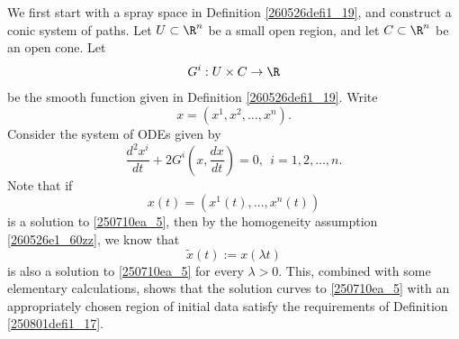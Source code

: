 \documentclass{article}
\numberwithin{equation}{section}
\theoremstyle{plain}
\begin{document}
We first start with a spray space in Definition \ref{260526defi1_19}, and construct a conic system of paths. Let $U\subset \R^n$ be a small open region, and let $C\subset \R^n$ be an open cone. Let
\begin{equation}
G^i: U\times C\to \R
\end{equation}
be the smooth function given in Definition \ref{260526defi1_19}. Write 
\begin{equation}
x=(x^1, x^2, \dots, x^n).
\end{equation}
Consider the system of ODEs given by
\begin{equation}\label{250710ea_5}
\frac{d^2 x^i}{dt}+ 2 G^i(x, \frac{dx}{dt})=0, \ \ i=1, 2, \dots, n.
\end{equation}
Note that if 
\begin{equation}
x(t)= (x^1(t), \dots, x^n(t))
\end{equation}
is a solution to \eqref{250710ea_5}, then by the homogeneity assumption  \eqref{260526e1_60zz}, we know that 
\begin{equation}
\widetilde{x}(t):=x(\lambda t)
\end{equation}
is also a solution to  \eqref{250710ea_5} for every $\lambda>0$. This, combined with some elementary calculations, shows that the solution curves to \eqref{250710ea_5} with an appropriately chosen region of initial data satisfy the requirements of Definition \ref{250801defi1_17}.  \\
\end{document}
